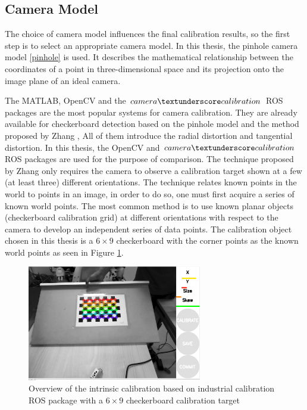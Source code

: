\subsection{Camera Model} \label{intrinsic}

The choice of camera model influences the final calibration results, so the first step is to select an appropriate camera model. In this thesis, the pinhole camera model \ref{pinhole} is used. It describes the mathematical relationship between the coordinates of a point in three-dimensional space and its projection onto the image plane of an ideal camera. 

The MATLAB, OpenCV  and the $camera\textunderscore calibration$ ROS \cite{calbRos} packages are the most popular systems for camera calibration. They are already available for checkerboard detection based on the pinhole model and the method proposed by Zhang \cite{Zhang}, All of them introduce the radial distortion and tangential distortion. In this thesis, the OpenCV and $camera\textunderscore calibration$ ROS packages are used for the purpose of comparison.
The technique proposed by Zhang only requires the camera to observe a calibration target shown at a few (at least three) different orientations. The technique relates known points in the world to points in an image, in order to do so, one must first acquire a series of known world points. The most common method is to use known planar objects (checkerboard calibration grid) at different orientations with respect to the camera to develop an independent series of data points. The calibration object chosen in this thesis is a $6\times9$ checkerboard with the corner points as the known world points as seen in Figure \ref{fig:target0}.

\begin{figure}[!h]
\begin{center}
\includegraphics[width=3in]{figures03/intros.png}
\caption{Overview of the intrinsic calibration based on industrial calibration ROS package with a  $6\times9$ checkerboard calibration target}%
\label{fig:target0}
\end{center}
\end{figure}

